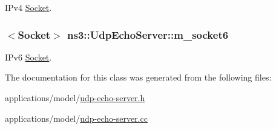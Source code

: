 I\+Pv4 \hyperlink{classns3_1_1Socket}{Socket}. 

\subsubsection[{\texorpdfstring{m\+\_\+socket6}{m_socket6}}]{$<${\bf Socket}$>$ ns3\+::\+Udp\+Echo\+Server\+::m\+\_\+socket6\hspace{0.3cm}{\ttfamily [private]}}\hypertarget{classns3_1_1UdpEchoServer_a6e0a6cf77c620920c00a0b6e5cc8d712}{}\label{classns3_1_1UdpEchoServer_a6e0a6cf77c620920c00a0b6e5cc8d712}


I\+Pv6 \hyperlink{classns3_1_1Socket}{Socket}. 



The documentation for this class was generated from the following files\+:\begin{DoxyCompactItemize}
\item 
applications/model/\hyperlink{udp-echo-server_8h}{udp-\/echo-\/server.\+h}\item 
applications/model/\hyperlink{udp-echo-server_8cc}{udp-\/echo-\/server.\+cc}\end{DoxyCompactItemize}
